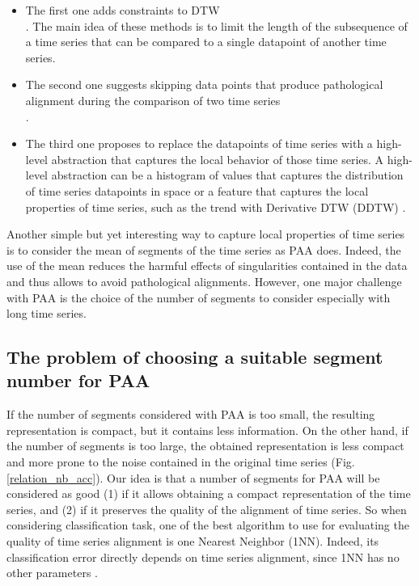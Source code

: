 \begin{itemize}
  \item The first one adds constraints to DTW \cite{Ratanamahatana_Keogh_2004} \cite{Yu_Yu_Hu_Liu_Wu_2011}  \cite{candan2012sdtw}  \cite{sakoe1978dynamic} \\ \cite{jeong2011weighted}  \cite{salvador2007toward}.
  The main idea of these methods is to limit the length of the subsequence of a time series
  that can be compared to a single datapoint of another time series.
  
  \item The second one suggests skipping data points that
  produce pathological alignment during the comparison of two time series \cite{longin2005elastic} \\ \cite{itakura1975minimum}  \cite{myers1980performance}.
  \item The third one proposes to replace the datapoints of time
  series with a high-level abstraction that captures the local behavior of those
  time series. A high-level abstraction can be a histogram of values that
  captures the distribution of time series datapoints in space \cite{Zhang_Tang_Duan_2015} or a 
  feature that captures the local  properties of time series, such as the trend with Derivative DTW
  (DDTW) \cite{Keogh_Pazzani_2001}.
\end{itemize}
Another simple but yet interesting way to capture local properties of time series is to  consider the mean of segments of the time series as PAA does. Indeed, the use of the mean reduces the harmful effects of singularities contained in the data and thus allows to avoid pathological
alignments.  However, one major challenge with PAA is the choice of the number of segments to
consider especially with long time series.


\subsection{The problem of choosing a suitable segment number for PAA}

If the number of segments considered with PAA is too small, the resulting
representation  is compact, but it contains less information. On the other hand, if the number of
segments is too large, the obtained representation  is less compact and more prone to the noise
contained in the original time series (Fig. \ref{relation_nb_acc}). Our idea is that a number of
segments for PAA will be considered as good (1) if it allows obtaining a compact representation of the
time series, and (2) if it preserves the quality of the alignment of time series. So when
considering classification task, one of the best algorithm to use for
evaluating the quality of time series alignment is one Nearest Neighbor (1NN).   
Indeed, its classification error directly depends on time series alignment, since 1NN has no other
parameters \cite{wang2013experimental}.


